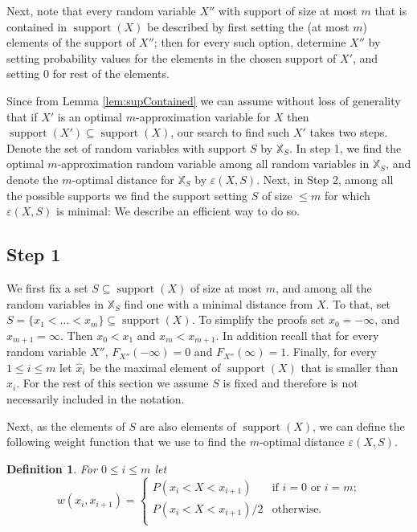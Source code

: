 \documentclass{article}
\newtheorem{definition}[thm]{Definition}
\DeclareMathOperator{\support}{support}
\begin{document}
Next, note that every random variable $X''$ with support of size at most $m$ that is contained in $\support(X)$ be described by first setting the (at most $m$) elements of the support of $X''$; then for every such option, determine $X''$ by setting probability values for the elements in the chosen support of $X'$, and setting $0$ for rest of the elements.

Since from Lemma \ref{lem:supContained} we can assume without loss of generality that if  $X'$ is an optimal $m$-approximation variable for $X$ then $\support(X') \subseteq \support(X)$, our search to find such $X'$ takes two steps. Denote the set of random variables with support $S$ by $\mathbb{X}_S$. In step 1, we find the optimal $m$-approximation random variable among all random variables in $\mathbb{X}_S$, and denote the $m$-optimal distance for $\mathbb{X}_S$ by $\varepsilon(X,S)$. Next, in Step 2, among all the possible supports we find the support setting $S$ of size $\leq m$ for which $\varepsilon(X,S)$ is minimal: We describe an efficient way to do so.

\subsection{Step 1}


We first fix a set $S\subseteq \support(X)$ of size at most $m$, and among all the random variables in $\mathbb{X}_S$ find one with a minimal distance from $X$. To that, set $S=\{x_1<\dots<x_m\} \subseteq \support(X)$. To simplify the proofs set $x_0=-\infty$, and $x_{m+1}=\infty$. Then $x_0<x_1$ and $x_m<x_{m+1}$. In addition recall that for every random variable $X''$, $F_{X''}(-\infty) = 0$ and $F_{X''}(\infty)=1$. Finally, for every $1\leq i \leq m$ let $\hat x_i$ be the maximal element of $\support(X)$ that is smaller than $x_i$.
For the rest of this section we assume $S$ is fixed and therefore is not necessarily included in the notation.

Next, as the elements of $S$ are also elements of $\support(X)$, we can define the following weight function that we use to find the $m$-optimal distance $\varepsilon(X,S)$. 

\begin{definition}\label{def:weight} For $0\leq i \leq m$ let
	\[
	w(x_i,x_{i+1})=
	\begin{cases}
	P(x_i < X < x_{i+1}) & \text{if $i=0$ or $i = m$;} \\
	P(x_i < X < x_{i+1})/2 & \text{otherwise.} \\	
	\end{cases}
	\]
\end{definition}
\end{document}
